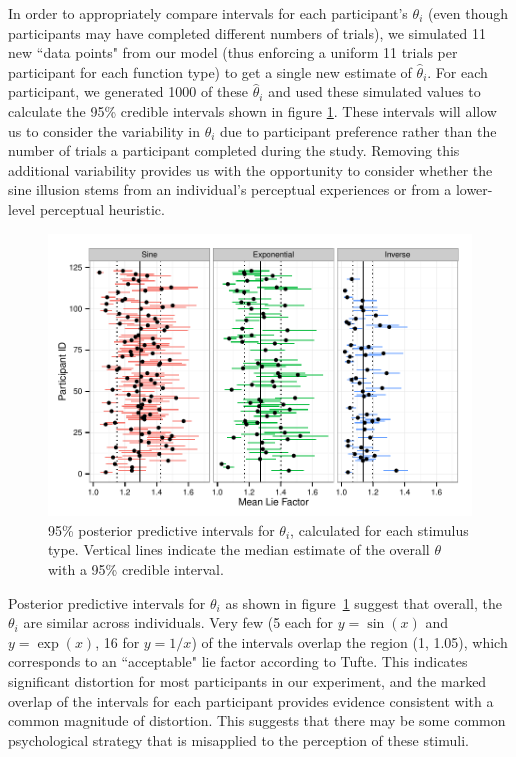 \documentclass[11pt]{isuthesis}\usepackage[]{graphicx}\usepackage[]{color}
\begin{document}
In order to appropriately compare intervals for each participant's $\theta_i$ (even though participants may have completed different numbers of trials), we simulated 11 new ``data points" from our model (thus enforcing a uniform 11 trials per participant for each function type) to get a single new estimate of $\hat\theta_i$. For each participant, we generated 1000 of these $\hat\theta_i$ and used these simulated values to calculate the 95\% credible intervals shown in figure \ref{fig:indivCIs}. These intervals will allow us to consider the variability in $\theta_i$ due to participant preference rather than the number of trials a participant completed during the study. Removing this additional variability provides us with the opportunity to consider whether the sine illusion stems from an individual's perceptual experiences or from a lower-level perceptual heuristic. 

\begin{figure}\centering
\includegraphics[width=6in, trim=0in .1in 0in .1in]{fig-CIindivMean}
\caption{95\% posterior predictive intervals for $\theta_i$, calculated for each stimulus type. Vertical lines indicate the median estimate of the overall $\theta$ with a 95\% credible interval.}\label{fig:indivCIs}
\end{figure}

Posterior predictive intervals for $\theta_i$ as shown in figure~\ref{fig:indivCIs} suggest that overall, the $\theta_i$ are similar across individuals. Very few (5 each for $y=\sin(x)$ and $y=\exp(x)$, 16 for $y=1/x$) of the intervals overlap the region (1, 1.05), which corresponds to an ``acceptable" lie factor according to Tufte. This indicates significant distortion for most participants in our experiment, and the marked overlap of the intervals for each participant provides evidence consistent with a common magnitude of distortion. This suggests that there may be some common psychological strategy that is misapplied to the perception of these stimuli. 
\end{document}
